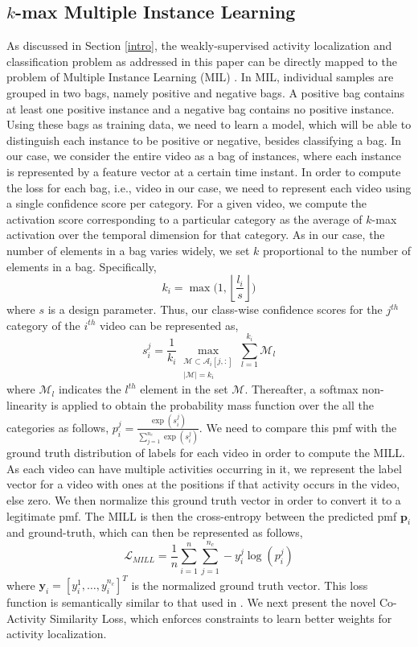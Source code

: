 \documentclass[runningheads]{llncs}
\begin{document}
\subsection{$k$-max Multiple Instance Learning}
As discussed in Section \ref{intro}, the weakly-supervised activity localization and classification problem as addressed in this paper can be directly mapped to the problem of Multiple Instance Learning (MIL) \cite{zhou2004multi}. In MIL, individual samples are grouped in two bags, namely positive and negative bags. A positive bag contains at least one positive instance and a negative bag contains no positive instance. Using these bags as training data, we need to learn a model, which will be able to distinguish each instance to be positive or negative, besides classifying a bag. In our case, we consider the entire video as a bag of instances, where each instance is represented by a feature vector at a certain time instant. In order to compute the loss for each bag, i.e., video in our case, we need to represent each video using a single confidence score per category. For a given video, we compute the activation score corresponding to a particular category as the average of $k$-max activation over the temporal dimension for that category. As in our case, the number of elements in a bag varies widely, we set $k$ proportional to the number of elements in a bag. Specifically,
\begin{equation}
k_i=\max\Big(1,\left \lfloor{\dfrac{l_i}{s}}\right \rfloor \Big)
\label{k}
\end{equation}
where $s$ is a design parameter. Thus, our class-wise confidence scores for the $j^{th}$ category of the $i^{th}$ video can be represented as,
\begin{equation}
s_i^j = \frac{1}{k_i} \max_{
	\substack{\mathcal{M} \subset \boldsymbol{\mathcal{A}}_i[j,:] \\
		|\mathcal{M}| = k_i}}	
\sum_{l=1}^{k_i} \mathcal{M}_l
\label{scores}
\end{equation}
where $\mathcal{M}_l$ indicates the $l^{th}$ element in the set $\mathcal{M}$. Thereafter, a softmax non-linearity is applied to obtain the probability mass function over the all the categories as follows, $p^j_i=\frac{\exp(s^j_i)}{\sum_{j=1}^{n_c}\exp(s^j_i)}$. We need to compare this pmf with the ground truth distribution of labels for each video in order to compute the MILL. As each video can have multiple activities occurring in it, we represent the label vector for a video with ones at the positions if that activity occurs in the video, else zero. We then normalize this ground truth vector in order to convert it to a legitimate pmf. The MILL is then the cross-entropy between the predicted pmf $\boldsymbol{p}_i$ and ground-truth, which can then be represented as follows,
\begin{equation}
\mathcal{L}_{MILL} = \frac{1}{n}\sum_{i=1}^n \sum_{j=1}^{n_c} -y_i^j\log(p_i^j)
\end{equation}
where $\boldsymbol{y}_i=[y_i^1,\dots,y_i^{n_c}]^T$ is the normalized ground truth vector. This loss function is semantically similar to that used in \cite{wang2017untrimmednets}. We next present the novel Co-Activity Similarity Loss, which enforces constraints to learn better weights for activity localization.
\end{document}
